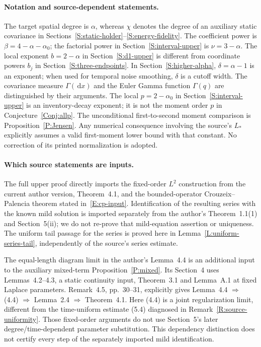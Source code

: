 \documentclass[12pt]{article}
\numberwithin{equation}{section}
\theoremstyle{definition}
\newcommand{\ud}{\,\mathrm{d}}
\begin{document}
\paragraph{Notation and source-dependent statements.}
The target spatial degree is $\alpha$, whereas $\chi$ denotes the degree
of an auxiliary static covariance in
Sections~\ref{S:static-holder}--\ref{S:energy-fidelity}.
The coefficient power is $\beta=4-\alpha-\alpha_0$; the factorial power in
Section~\ref{S:interval-upper} is $\nu=3-\alpha$.
The local exponent $b=2-\alpha$ in Section~\ref{S:d1-upper} is different
from coordinate powers $b_j$ in Section~\ref{S:three-endpoints}.
In Section~\ref{S:higher-alpha}, $\delta=\alpha-1$ is an exponent;
when used for temporal noise smoothing, $\delta$ is a cutoff width.
The covariance measure $\Gamma(\ud x)$ and the Euler Gamma function
$\Gamma(q)$ are distinguished by their arguments. The local
$p=2-\alpha_0$ in Section~\ref{S:interval-upper} is an inventory-decay
exponent; it is not the moment order $p$ in Conjecture~\ref{Conj:allp}.
The unconditional first-to-second moment comparison is
Proposition~\ref{P:Jensen}. Any numerical consequence involving the
source's $L_*$ explicitly assumes a valid first-moment lower bound with
that constant. No correction of its printed normalization is adopted.

\paragraph{Which source statements are inputs.}
The full upper proof directly imports the fixed-order $L^2$ construction
from the current author version, Theorem~4.1, and the bounded-operator
Crouzeix--Palencia theorem stated in~\eqref{E:cp-input}.
Identification of the resulting series with the known mild solution is
imported separately from the author's Theorem~1.1(1) and Section~5(ii);
we do not re-prove that mild-equation assertion or uniqueness.
The uniform tail passage for the series is proved here in
Lemma~\ref{L:uniform-series-tail}, independently of the source's series estimate.

The equal-length diagram limit in the author's Lemma~4.4 is an additional
input to the auxiliary mixed-term Proposition~\ref{P:mixed}.
Its Section~4 uses Lemmas~4.2--4.3, a static continuity input,
Theorem~3.1 and Lemma~A.1 at fixed Laplace parameters. Remark~4.5,
pp.~30--31, explicitly gives Lemma~4.4 $\Rightarrow$ (4.4)
$\Rightarrow$ Lemma~2.4 $\Rightarrow$ Theorem~4.1.
Here (4.4) is a joint regularization limit, different from the
time-uniform estimate (5.4) diagnosed in Remark~\ref{R:source-uniformity}.
Those fixed-order arguments do not use Section~5's later
degree/time-dependent parameter substitution. This dependency distinction
does not certify every step of the separately imported mild identification.
\end{document}
